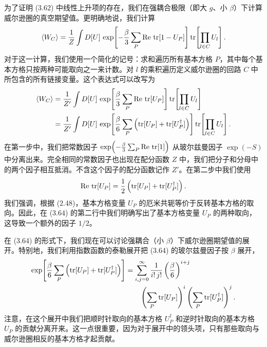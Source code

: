 为了证明 (3.62) 中线性上升项的存在，我们在强耦合极限（即大 $g$、小 $\beta$）下计算威尔逊圈的真空期望值。更明确地说，我们计算
\begin{equation}
  \left\langle W_C \right\rangle = \frac{1}{Z}\int D[U]\,
    \exp\!\left[-\frac{\beta}{3}\sum_P \operatorname{Re}\,\operatorname{tr}[1 - U_P]\right]
    \operatorname{tr}\!\left[\prod_{l\in C} U_l\right] .
\end{equation}
对于这一计算，我们使用一个简化的记号：求和遍历所有基本方格 $P$，其中每个基本方格只按两种可能取向之一来计数。对 $l$ 的乘积遍历定义威尔逊圈的回路 $C$ 中所包含的所有链接变量。这个表达式可以改写为
\begin{equation}
\begin{split}
  \left\langle W_C \right\rangle &= \frac{1}{Z'}\int D[U]\,
    \exp\!\left[\frac{\beta}{3}\sum_P \operatorname{Re}\,\operatorname{tr}[U_P]\right]
    \operatorname{tr}\!\left[\prod_{l\in C} U_l\right] \\
  &= \frac{1}{Z'}\int D[U]\,
    \exp\!\left[\frac{\beta}{6}\sum_P \left(\operatorname{tr}[U_P] + \operatorname{tr}[U_P^\dagger]\right)\right]
    \operatorname{tr}\!\left[\prod_{l\in C} U_l\right] .
\end{split}
\end{equation}
在第一步中，我们把常数因子 $\exp\!\left(-\frac{\beta}{3}\sum_P \operatorname{Re}\,\operatorname{tr}[1]\right)$ 从玻尔兹曼因子 $\exp(-S)$ 中分离出来。完全相同的常数因子也出现在配分函数 $Z$ 中，我们把分子和分母中的两个因子相互抵消。不含这个因子的配分函数记作 $Z'$。在第二步中我们使用
\begin{equation}
  \operatorname{Re}\,\operatorname{tr}[U_P] = \frac{1}{2}\left(\operatorname{tr}[U_P] + \operatorname{tr}[U_P^\dagger]\right) .
\end{equation}
我们强调，根据 (2.48)，基本方格变量 $U_P$ 的厄米共轭等价于反转基本方格的取向。因此，在 (3.64) 的第二行中我们明确写出了基本方格变量 $U_P$ 的两种取向，这导致一个额外的因子 $1/2$。

在 (3.64) 的形式下，我们现在可以讨论强耦合（小 $\beta$）下威尔逊圈期望值的展开。特别地，我们利用指数函数的泰勒展开把 (3.64) 的玻尔兹曼因子按 $\beta$ 展开，
\begin{equation}
  \begin{split}
    \exp\!\left[\frac{\beta}{6}\sum_P \left(\operatorname{tr}[U_P] + \operatorname{tr}[U_P^\dagger]\right)\right]
    &= \sum_{i,j=0}^{\infty}\frac{1}{i!\,j!}\left(\frac{\beta}{6}\right)^{i+j}\\
    &\qquad \left(\sum_P \operatorname{tr}[U_P]\right)^{i}
      \left(\sum_P \operatorname{tr}[U_P^\dagger]\right)^{j} .
  \end{split}
\end{equation}
注意，在这个展开中我们把顺时针取向的基本方格 $U_P^\dagger$ 和逆时针取向的基本方格 $U_P$ 的贡献分离开来。这一点很重要，因为对于展开中的领头项，只有那些取向与威尔逊圈相反的基本方格才起贡献。

